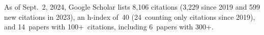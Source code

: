 %
As of Sept.~2, 2024, Google Scholar lists
8,106 citations (3,229 since 2019 and 599 new citations in 2023),
an h-index of~40 (24~counting only citations since 2019),
and 14~papers with 100+~citations, including 6~papers with 300+.
